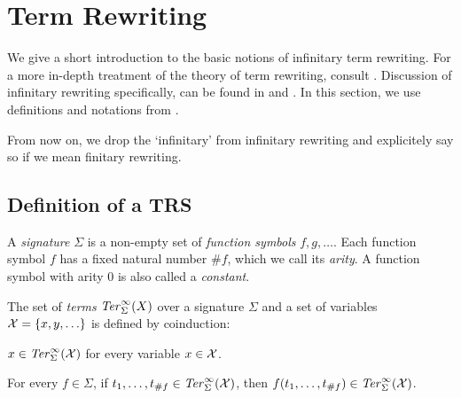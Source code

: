 

\section{Term Rewriting}\label{sec:rewriting}


We give a short introduction to the basic notions of infinitary term
rewriting. For a more in-depth treatment of the theory of term rewriting,
consult \citet{terese-03}. Discussion of infinitary rewriting
specifically, can be found in \citet[chap. 12]{terese-03} and
\citet{klop-de-vrijer-05}. In this section, we use definitions and
notations from \citet{terese-03}.

From now on, we drop the `infinitary' from infinitary rewriting and
explicitely say so if we mean finitary rewriting.


\subsection{Definition of a TRS}\label{sub:trs}

\begin{definition}%
A \emph{signature} $\Sigma$ is a non-empty set of \emph{function symbols} $f,
g, \ldots$. Each function symbol $f$ has a fixed natural number $\#f$, which
we call its \emph{arity}. A function symbol with arity $0$ is also called a
\emph{constant}.
\end{definition}

\begin{definition}%
The set of \emph{terms} $\mathit{Ter}_\Sigma^\infty(X)$ over a signature $\Sigma$ and a
set of variables $\mathcal{X} = \{x, y, \ldots\}$ is defined by coinduction:
\begin{compactenum}
  \item
    $x \in \mathit{Ter}_\Sigma^\infty(\mathcal{X})$ for every variable $x \in \mathcal{X}$.
  \item
    For every $f \in \Sigma$, if $t_1, \ldots, t_{\#f} \in \mathit{Ter}_\Sigma^\infty(\mathcal{X})$,
    then $f(t_1, \ldots, t_{\#f}) \in \mathit{Ter}_\Sigma^\infty(\mathcal{X})$.
\end{compactenum}
\end{definition}

